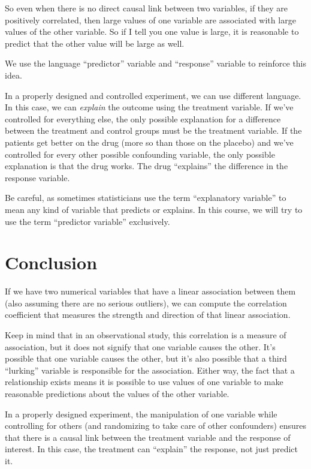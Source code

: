 \documentclass[
]{book}
\begin{document}
So even when there is no direct causal link between two variables, if they are positively correlated, then large values of one variable are associated with large values of the other variable. So if I tell you one value is large, it is reasonable to predict that the other value will be large as well.

We use the language ``predictor'' variable and ``response'' variable to reinforce this idea.

In a properly designed and controlled experiment, we can use different language. In this case, we can \emph{explain} the outcome using the treatment variable. If we've controlled for everything else, the only possible explanation for a difference between the treatment and control groups must be the treatment variable. If the patients get better on the drug (more so than those on the placebo) and we've controlled for every other possible confounding variable, the only possible explanation is that the drug works. The drug ``explains'' the difference in the response variable.

Be careful, as sometimes statisticians use the term ``explanatory variable'' to mean any kind of variable that predicts or explains. In this course, we will try to use the term ``predictor variable'' exclusively.

\hypertarget{correlation-conclusion}{%
\section{Conclusion}\label{correlation-conclusion}}

If we have two numerical variables that have a linear association between them (also assuming there are no serious outliers), we can compute the correlation coefficient that measures the strength and direction of that linear association.

Keep in mind that in an observational study, this correlation is a measure of association, but it does not signify that one variable causes the other. It's possible that one variable causes the other, but it's also possible that a third ``lurking'' variable is responsible for the association. Either way, the fact that a relationship exists means it is possible to use values of one variable to make reasonable predictions about the values of the other variable.

In a properly designed experiment, the manipulation of one variable while controlling for others (and randomizing to take care of other confounders) ensures that there is a causal link between the treatment variable and the response of interest. In this case, the treatment can ``explain'' the response, not just predict it.
\end{document}
